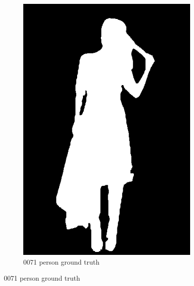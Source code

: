 \documentclass{csc_assignment5}
\begin{document}
\begin{description}
\begin{figure}[h!]
\begin{subfigure}[b]{0.3\textwidth}
        \includegraphics[width=\textwidth]{labels/0071_person.png}
        \caption{0071 person ground truth}
    \end{subfigure}
\end{figure}


\end{description}
\end{document}
